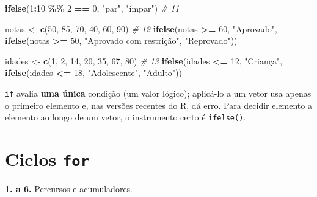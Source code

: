 \documentclass[
  portuguese,
  11pt,
  openany]{book}
\newenvironment{Shaded}{\begin{snugshade}}{\end{snugshade}}
\newcommand{\CommentTok}[1]{\textcolor[rgb]{0.56,0.35,0.01}{\textit{#1}}}
\newcommand{\DecValTok}[1]{\textcolor[rgb]{0.00,0.00,0.81}{#1}}
\newcommand{\FunctionTok}[1]{\textcolor[rgb]{0.13,0.29,0.53}{\textbf{#1}}}
\newcommand{\NormalTok}[1]{#1}
\newcommand{\OtherTok}[1]{\textcolor[rgb]{0.56,0.35,0.01}{#1}}
\newcommand{\SpecialCharTok}[1]{\textcolor[rgb]{0.81,0.36,0.00}{\textbf{#1}}}
\newcommand{\StringTok}[1]{\textcolor[rgb]{0.31,0.60,0.02}{#1}}
\begin{document}
\begin{Shaded}
\begin{Highlighting}[]
\FunctionTok{ifelse}\NormalTok{(}\DecValTok{1}\SpecialCharTok{:}\DecValTok{10} \SpecialCharTok{\%\%} \DecValTok{2} \SpecialCharTok{==} \DecValTok{0}\NormalTok{, }\StringTok{"par"}\NormalTok{, }\StringTok{"ímpar"}\NormalTok{)                    }\CommentTok{\# 11}

\NormalTok{notas }\OtherTok{\textless{}{-}} \FunctionTok{c}\NormalTok{(}\DecValTok{50}\NormalTok{, }\DecValTok{85}\NormalTok{, }\DecValTok{70}\NormalTok{, }\DecValTok{40}\NormalTok{, }\DecValTok{60}\NormalTok{, }\DecValTok{90}\NormalTok{)                        }\CommentTok{\# 12}
\FunctionTok{ifelse}\NormalTok{(notas }\SpecialCharTok{\textgreater{}=} \DecValTok{60}\NormalTok{, }\StringTok{"Aprovado"}\NormalTok{,}
       \FunctionTok{ifelse}\NormalTok{(notas }\SpecialCharTok{\textgreater{}=} \DecValTok{50}\NormalTok{, }\StringTok{"Aprovado com restrição"}\NormalTok{, }\StringTok{"Reprovado"}\NormalTok{))}

\NormalTok{idades }\OtherTok{\textless{}{-}} \FunctionTok{c}\NormalTok{(}\DecValTok{1}\NormalTok{, }\DecValTok{2}\NormalTok{, }\DecValTok{14}\NormalTok{, }\DecValTok{20}\NormalTok{, }\DecValTok{35}\NormalTok{, }\DecValTok{67}\NormalTok{, }\DecValTok{80}\NormalTok{)                     }\CommentTok{\# 13}
\FunctionTok{ifelse}\NormalTok{(idades }\SpecialCharTok{\textless{}=} \DecValTok{12}\NormalTok{, }\StringTok{"Criança"}\NormalTok{,}
       \FunctionTok{ifelse}\NormalTok{(idades }\SpecialCharTok{\textless{}=} \DecValTok{18}\NormalTok{, }\StringTok{"Adolescente"}\NormalTok{, }\StringTok{"Adulto"}\NormalTok{))}
\end{Highlighting}
\end{Shaded}

\texttt{if} avalia \textbf{uma única} condição (um valor lógico); aplicá-lo a um vetor usa
apenas o primeiro elemento e, nas versões recentes do R, dá erro. Para decidir
elemento a elemento ao longo de um vetor, o instrumento certo é \texttt{ifelse()}.

\section{\texorpdfstring{Ciclos \texttt{for}}{Ciclos for}}\label{ciclos-for}

\textbf{1. a 6.} Percursos e acumuladores.
\end{document}
